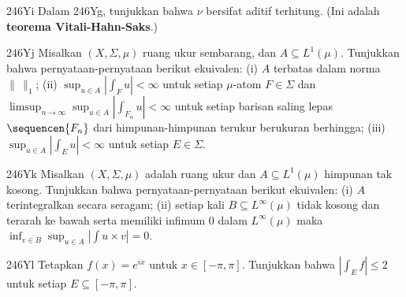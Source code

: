 {\spheader 246Yi Dalam 246Yg, tunjukkan bahwa $\nu$ bersifat aditif terhitung.
 (Ini adalah {\bf teorema
Vitali-Hahn-Saks}.)

\spheader 246Yj Misalkan $(X,\Sigma,\mu)$ ruang ukur sembarang, dan
$A\subseteq L^1(\mu)$. Tunjukkan bahwa pernyataan-pernyataan berikut
ekuivalen: (i) $A$ terbatas dalam norma $\|\,\|_1$; (ii)
$\sup_{u\in A}|\int_Fu|<\infty$ untuk setiap $\mu$-atom $F\in\Sigma$ dan
$\limsup_{n\to\infty}\sup_{u\in A}|\int_{F_n}u|<\infty$ untuk setiap barisan
saling lepas $\sequencen{F_n}$ dari himpunan-himpunan terukur berukuran
berhingga; (iii) $\sup_{u\in
A}|\int_Eu|<\infty$ untuk setiap $E\in\Sigma$. 


\spheader 246Yk Misalkan $(X,\Sigma,\mu)$ adalah ruang ukur dan $A\subseteq
L^1(\mu)$ himpunan tak kosong. Tunjukkan bahwa pernyataan-pernyataan berikut
ekuivalen: (i) $A$ terintegralkan secara seragam; (ii) setiap kali
$B\subseteq
L^{\infty}(\mu)$ tidak kosong dan terarah ke bawah serta memiliki
infimum $0$ dalam $L^{\infty}(\mu)$ maka $\inf_{v\in B}\sup_{u\in A}|\int u\times
v|=0$. 

\spheader 246Yl Tetapkan $f(x)=e^{ix}$ untuk $x\in[-\pi,\pi]$. Tunjukkan bahwa
$|\int_Ef|\le 2$ untuk setiap $E\subseteq[-\pi,\pi]$.
}%

